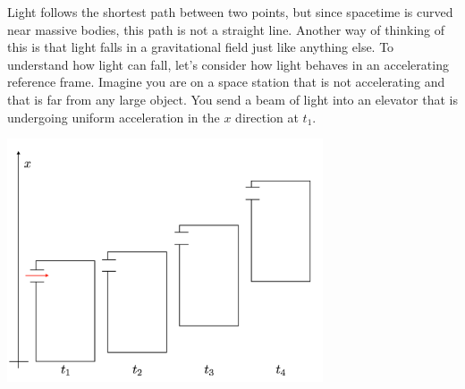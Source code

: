 \documentclass[12pt]{exam}
\begin{document}
\begin{questions}

\question Light follows the shortest path between two points, but since spacetime is curved near massive bodies, this path is not a straight line. Another way of thinking of this is that light falls in a gravitational field just like anything else. To understand how light can fall, let's consider how light behaves in an accelerating reference frame. Imagine you are on a space station that is not accelerating and that is far from any large object. You send a beam of light into an elevator that is undergoing uniform acceleration in the $x$ direction at $t_1$.

\begin{center}
\includegraphics[width=0.7\textwidth]{../images/coop12_elevator.png}
\end{center}

\begin{parts}

\end{parts}
\end{questions}
\end{document}
